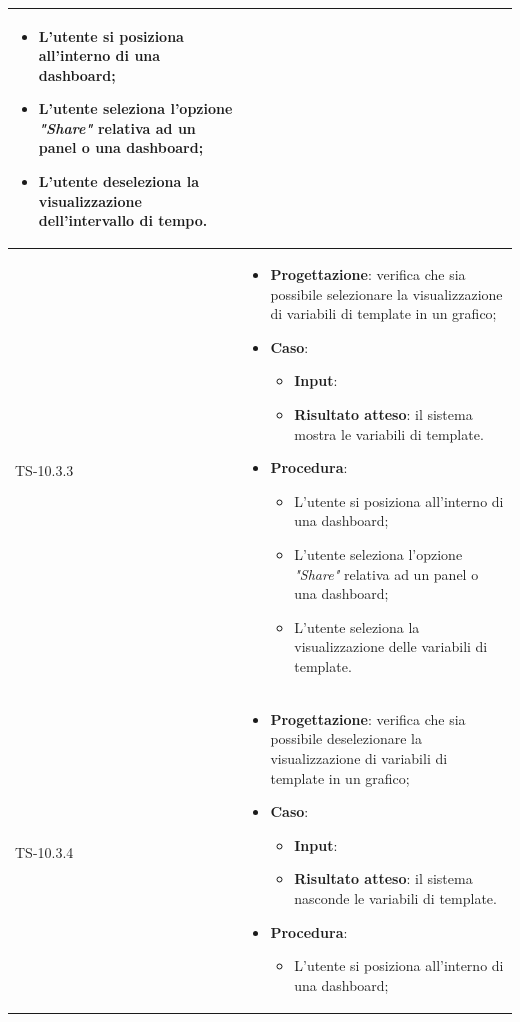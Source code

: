 \begin{longtable}{|C{2.5cm}|C{13cm}|}
\begin{itemize}
	\begin{itemize}
		\item L'utente si posiziona all'interno di una dashboard;
		\item L'utente seleziona l'opzione \emph{"Share"} relativa ad un panel o una dashboard;
		\item L'utente deseleziona la visualizzazione dell'intervallo di tempo.
	\end{itemize} 
\end{itemize}
	 \\
	\hline
	{TS-10.3.3} &
\begin{itemize}
	\item \textbf{Progettazione}: verifica che sia possibile selezionare la
	visualizzazione di variabili di template in un grafico;
	\item \textbf{Caso}: 
	\begin{itemize}
		\item \textbf{Input}: 
		\item \textbf{Risultato atteso}: il sistema mostra le variabili di template.
	\end{itemize}
	\item \textbf{Procedura}:
	\begin{itemize}
		\item L'utente si posiziona all'interno di una dashboard;
		\item L'utente seleziona l'opzione \emph{"Share"} relativa ad un panel o una dashboard;
		\item L'utente seleziona la visualizzazione delle variabili di template.
	\end{itemize} 
\end{itemize}
	  \\
	\hline
	{TS-10.3.4} &
\begin{itemize}
	\item \textbf{Progettazione}: verifica che sia  possibile deselezionare la
	visualizzazione di variabili di template in un grafico;
	\item \textbf{Caso}: 
	\begin{itemize}
		\item \textbf{Input}: 
		\item \textbf{Risultato atteso}: il sistema nasconde le variabili di template.
	\end{itemize}
	\item \textbf{Procedura}:
	\begin{itemize}
		\item L'utente si posiziona all'interno di una dashboard;

\end{itemize}
\end{itemize}
\end{longtable}
